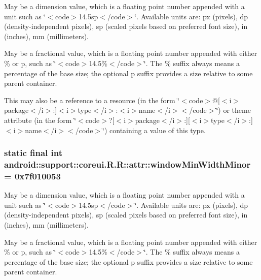 May be a dimension value, which is a floating point number appended with a unit such as \char`\"{}$<$code$>$14.5sp$<$/code$>$\char`\"{}. Available units are: px (pixels), dp (density-independent pixels), sp (scaled pixels based on preferred font size), in (inches), mm (millimeters). 

May be a fractional value, which is a floating point number appended with either \% or p, such as \char`\"{}$<$code$>$14.5\%$<$/code$>$\char`\"{}. The \% suffix always means a percentage of the base size; the optional p suffix provides a size relative to some parent container. 

This may also be a reference to a resource (in the form \char`\"{}$<$code$>$@\mbox{[}$<$i$>$package$<$/i$>$:\mbox{]}$<$i$>$type$<$/i$>$:$<$i$>$name$<$/i$>$$<$/code$>$\char`\"{}) or theme attribute (in the form \char`\"{}$<$code$>$?\mbox{[}$<$i$>$package$<$/i$>$:\mbox{]}\mbox{[}$<$i$>$type$<$/i$>$:\mbox{]}$<$i$>$name$<$/i$>$$<$/code$>$\char`\"{}) containing a value of this type. \hypertarget{classandroid_1_1support_1_1coreui_1_1_r_1_1attr_523c22b9d1affd1ce44ea19c525789bb}{
\subsubsection[{windowMinWidthMinor}]{\setlength{\rightskip}{0pt plus 5cm}static final int android::support::coreui.R.R::attr::windowMinWidthMinor = 0x7f010053}}
\label{classandroid_1_1support_1_1coreui_1_1_r_1_1attr_523c22b9d1affd1ce44ea19c525789bb}


May be a dimension value, which is a floating point number appended with a unit such as \char`\"{}$<$code$>$14.5sp$<$/code$>$\char`\"{}. Available units are: px (pixels), dp (density-independent pixels), sp (scaled pixels based on preferred font size), in (inches), mm (millimeters). 

May be a fractional value, which is a floating point number appended with either \% or p, such as \char`\"{}$<$code$>$14.5\%$<$/code$>$\char`\"{}. The \% suffix always means a percentage of the base size; the optional p suffix provides a size relative to some parent container. 

